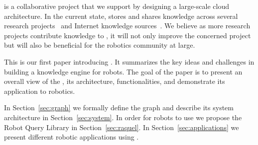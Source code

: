 \robobrain{} is a collaborative project that we support by designing a large-scale cloud architecture.
In the current state, \robobrain{} stores and shares knowledge across several research projects~\cite{tellex2011understanding,misra2014tell,jainsaxena2013_trajectorypreferences,jiang-hallucinatinghumans-labeling3dscenes-cvpr2013,jiang2012humancontext,KoppulaRSS2013,wulenzsaxena2014_hierarchicalrgbdlabeling,lenz2013_deeplearning_roboticgrasp} and Internet knowledge sources~\citep{cyc1995,wordnet1998}.
We believe as more research projects contribute knowledge to \robobrain{}, it will not only improve the concerned project but will
also be beneficial for the robotics community at large.

This is our first paper introducing \robobrain{}. It summarizes the key ideas and challenges in building a knowledge engine for robots. The goal of the paper is to present an overall view of the \robobrain{}, its architecture, functionalities, and demonstrate its application to robotics.

 In
Section~\ref{sec:graph} we formally define the \robobrain{} graph and describe its
system architecture in Section~\ref{sec:system}. In order for robots to use
\robobrain{} we propose the Robot Query Library in Section~\ref{sec:raquel}. In
Section~\ref{sec:applications} we present different robotic applications using \robobrain{}.
